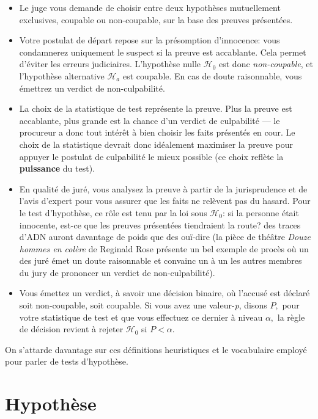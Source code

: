 \documentclass[
  11pt,
  letterpaper,
]{scrbook}
\providecommand{\tightlist}{%
  \setlength{\itemsep}{0pt}\setlength{\parskip}{0pt}}\usepackage{longtable,booktabs,array}
\theoremstyle{plain}
\theoremstyle{plain}
\theoremstyle{definition}
\theoremstyle{definition}
\theoremstyle{remark}
\begin{document}
\begin{itemize}
\tightlist
\item
  Le juge vous demande de choisir entre deux hypothèses mutuellement
  exclusives, coupable ou non-coupable, sur la base des preuves
  présentées.
\item
  Votre postulat de départ repose sur la présomption d'innocence: vous
  condamnerez uniquement le suspect si la preuve est accablante. Cela
  permet d'éviter les erreurs judiciaires. L'hypothèse nulle
  \(\mathscr{H}_0\) est donc \emph{non-coupable}, et l'hypothèse
  alternative \(\mathscr{H}_a\) est coupable. En cas de doute
  raisonnable, vous émettrez un verdict de non-culpabilité.
\item
  La choix de la statistique de test représente la preuve. Plus la
  preuve est accablante, plus grande est la chance d'un verdict de
  culpabilité --- le procureur a donc tout intérêt à bien choisir les
  faits présentés en cour. Le choix de la statistique devrait donc
  idéalement maximiser la preuve pour appuyer le postulat de culpabilité
  le mieux possible (ce choix reflète la \textbf{puissance} du test).
\item
  En qualité de juré, vous analysez la preuve à partir de la
  jurisprudence et de l'avis d'expert pour vous assurer que les faits ne
  relèvent pas du hasard. Pour le test d'hypothèse, ce rôle est tenu par
  la loi sous \(\mathscr{H}_0\): si la personne était innocente, est-ce
  que les preuves présentées tiendraient la route? des traces d'ADN
  auront davantage de poids que des ouï-dire (la pièce de théâtre
  \emph{Douze hommes en colère} de Reginald Rose présente un bel exemple
  de procès où un des juré émet un doute raisonnable et convainc un à un
  les autres membres du jury de prononcer un verdict de
  non-culpabilité).
\item
  Vous émettez un verdict, à savoir une décision binaire, où l'accusé
  est déclaré soit non-coupable, soit coupable. Si vous avez une
  valeur-\emph{p}, disons \(P,\) pour votre statistique de test et que
  vous effectuez ce dernier à niveau \(\alpha,\) la règle de décision
  revient à rejeter \(\mathscr{H}_0\) si \(P < \alpha.\)
\end{itemize}

On s'attarde davantage sur ces définitions heuristiques et le
vocabulaire employé pour parler de tests d'hypothèse.

\section{Hypothèse}\label{hypothuxe8se}
\end{document}
